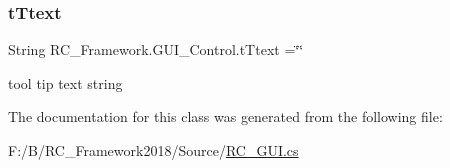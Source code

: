 \subsubsection{\texorpdfstring{t\+Ttext}{tTtext}}
{\footnotesize\ttfamily String R\+C\+\_\+\+Framework.\+G\+U\+I\+\_\+\+Control.\+t\+Ttext =\char`\"{}\char`\"{}}



tool tip text string 



The documentation for this class was generated from the following file\+:\begin{DoxyCompactItemize}
\item 
F\+:/\+B/\+R\+C\+\_\+\+Framework2018/\+Source/\mbox{\hyperlink{_r_c___g_u_i_8cs}{R\+C\+\_\+\+G\+U\+I.\+cs}}\end{DoxyCompactItemize}
